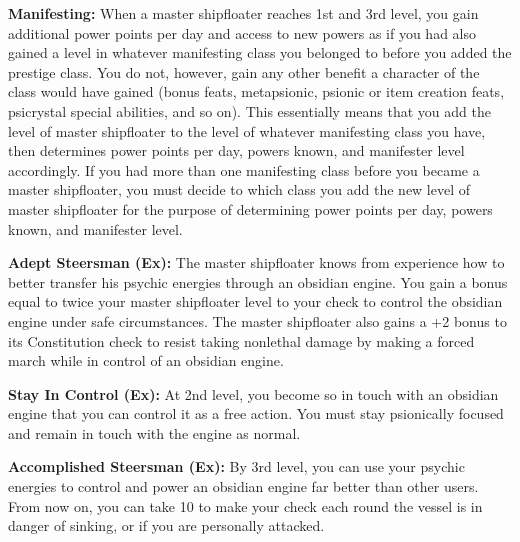{
\textbf{Manifesting:} When a master shipfloater reaches 1st and 3rd level, you gain additional power points per day and access to new powers as if you had also gained a level in whatever manifesting class you belonged to before you added the prestige class. You do not, however, gain any other benefit a character of the class would have gained (bonus feats, metapsionic, psionic or item creation feats, psicrystal special abilities, and so on). This essentially means that you add the level of master shipfloater to the level of whatever manifesting class you have, then determines power points per day, powers known, and manifester level accordingly. If you had more than one manifesting class before you became a master shipfloater, you must decide to which class you add the new level of master shipfloater for the purpose of determining power points per day, powers known, and manifester level.

\textbf{Adept Steersman (Ex):} The master shipfloater knows from experience how to better transfer his psychic energies through an obsidian engine. You gain a bonus equal to twice your master shipfloater level to your  check to control the obsidian engine under safe circumstances. The master shipfloater also gains a +2 bonus to its Constitution check to resist taking nonlethal damage by making a forced march while in control of an obsidian engine.

\textbf{Stay In Control (Ex):} At 2nd level, you become so in touch with an obsidian engine that you can control it as a free action. You must stay psionically focused and remain in touch with the engine as normal.

\textbf{Accomplished Steersman (Ex):} By 3rd level, you can use your psychic energies to control and power an obsidian engine far better than other users. From now on, you can take 10 to make your  check each round the vessel is in danger of sinking, or if you are personally attacked.
}
